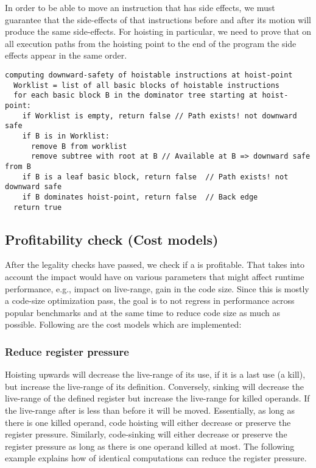 \documentclass[acmlarge,review,anonymous]{acmart}\settopmatter{printfolios=true}
\begin{document}
In order to be able to move an instruction that has side effects, we must
guarantee that the side-effects of that instructions before and after its motion
will produce the same side-effects.  For hoisting in particular, we need to
prove that on all execution paths from the hoisting point to the end of the
program the side effects appear in the same order.

\begin{verbatim}
computing downward-safety of hoistable instructions at hoist-point
  Worklist = list of all basic blocks of hoistable instructions
  for each basic block B in the dominator tree starting at hoist-point:
    if Worklist is empty, return false // Path exists! not downward safe
    if B is in Worklist:
      remove B from worklist
      remove subtree with root at B // Available at B => downward safe from B
    if B is a leaf basic block, return false  // Path exists! not downward safe
    if B dominates hoist-point, return false  // Back edge
  return true
\end{verbatim}

\subsection{Profitability check (Cost models)}
\label{subsec:cost-models}
After the legality checks have passed, we check if a \gcm{} is profitable.
That takes into account the impact \gcm{} would have on various parameters
that might affect runtime performance, e.g., impact on live-range, gain in the
code size. Since this is mostly a code-size optimization pass, the goal is to
not regress in performance across popular benchmarks and at the same time to reduce
code size as much as possible. Following are the cost models which are
implemented:

\subsubsection{Reduce register pressure}
\label{hoist:reg-pressure}
Hoisting upwards will decrease the live-range of its use, if it is a last use (a
kill), but increase the live-range of its definition. Conversely, sinking will
decrease the live-range of the defined register but increase the live-range for
killed operands. If the live-range after \gcm{} is less than before it will
be moved. Essentially, as long as there is one killed operand, code hoisting
will either decrease or preserve the register pressure.  Similarly, code-sinking
will either decrease or preserve the register pressure as long as there is one
operand killed at most.  The following example explains how \gcm{} of
identical computations can reduce the register pressure.
\end{document}
